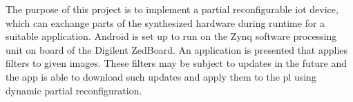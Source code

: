 The purpose of this project is to implement a partial reconfigurable \gls{iot}
device, which can exchange parts of the synthesized hardware during runtime for
a suitable application.
Android is set up to run on the Zynq software processing unit on board of the
Digilent ZedBoard.
An application is presented that applies filters to given images.
These filters may be subject to updates in the future and the app is able to
download such updates and apply them to the \gls{pl} using dynamic partial
reconfiguration.
